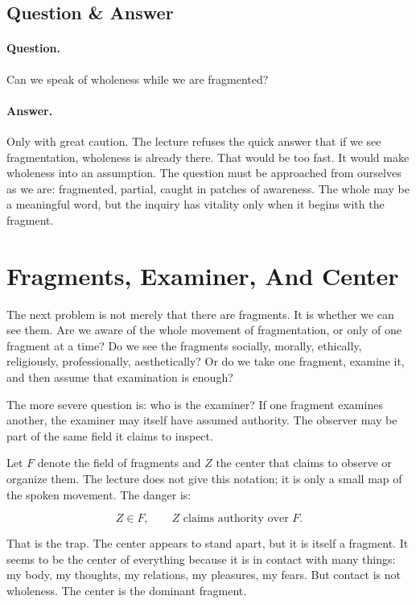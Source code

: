\subsection{Question \& Answer}

\paragraph{Question.}
Can we speak of wholeness while we are fragmented?

\paragraph{Answer.}
Only with great caution. The lecture refuses the quick answer that if we see fragmentation, wholeness is already there. That would be too fast. It would make wholeness into an assumption. The question must be approached from ourselves as we are: fragmented, partial, caught in patches of awareness. The whole may be a meaningful word, but the inquiry has vitality only when it begins with the fragment.

\section{Fragments, Examiner, And Center}

The next problem is not merely that there are fragments. It is whether we can see them. Are we aware of the whole movement of fragmentation, or only of one fragment at a time? Do we see the fragments socially, morally, ethically, religiously, professionally, aesthetically? Or do we take one fragment, examine it, and then assume that examination is enough?

The more severe question is: who is the examiner? If one fragment examines another, the examiner may itself have assumed authority. The observer may be part of the same field it claims to inspect.

Let \(F\) denote the field of fragments and \(Z\) the center that claims to observe or organize them. The lecture does not give this notation; it is only a small map of the spoken movement. The danger is:

\begin{equation}
Z \in F,
\qquad
Z \text{ claims authority over } F.
\end{equation}

That is the trap. The center appears to stand apart, but it is itself a fragment. It seems to be the center of everything because it is in contact with many things: my body, my thoughts, my relations, my pleasures, my fears. But contact is not wholeness. The center is the dominant fragment.

